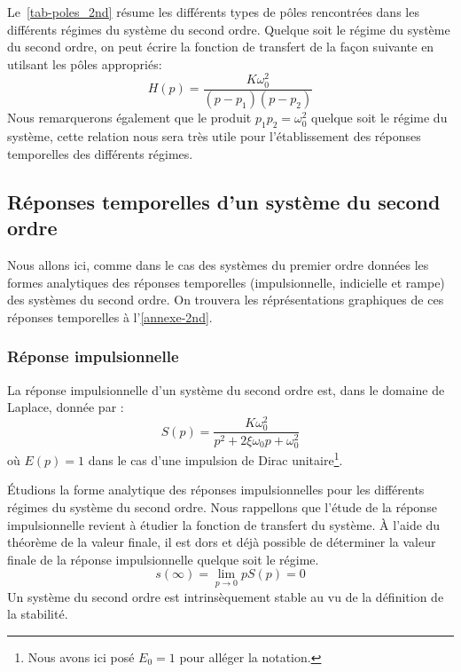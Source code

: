 Le~\cref{tab-poles_2nd} résume les différents types de pôles rencontrées dans 
les différents régimes du système du second ordre.
Quelque soit le régime du système du second ordre, on peut écrire la fonction 
de transfert de la façon suivante en utilsant les pôles appropriés:
\[
H(p)=\dfrac{K\omega^2_0}{(p-p_1)(p-p_2)}
\]
Nous remarquerons également que le produit $p_1p_2=\omega^2_0$ quelque soit 
le régime du système, cette relation nous sera très utile pour 
l'établissement des réponses temporelles des différents régimes.
\subsection{Réponses temporelles d'un système du second ordre}
Nous allons ici, comme dans le cas des systèmes du premier ordre données 
les formes analytiques des réponses temporelles (impulsionnelle, indicielle 
et rampe) des systèmes du second ordre. On trouvera les réprésentations 
graphiques de ces réponses temporelles à l'\cref{annexe-2nd}.
\subsubsection{Réponse impulsionnelle}
La réponse impulsionnelle d'un système du second ordre est, dans le domaine 
de Laplace, donnée par :
\[
S(p)=\dfrac{K\omega_0^2}{p^2+2\xi\omega_0p+\omega_0^2}
\]
où $E(p)=1$ dans le cas d'une impulsion de Dirac unitaire\footnote{Nous avons 
ici posé $E_0=1$ pour alléger la notation.}.

\'Etudions la forme analytique des réponses impulsionnelles pour les 
différents régimes du système du second ordre. Nous rappellons que l'étude 
de la réponse impulsionnelle revient à étudier la fonction de 
transfert du système. 
\`A l'aide du théorème de la valeur finale, 
il est dors et déjà possible de déterminer la valeur finale de la réponse
impulsionnelle quelque soit le régime.
\[
s(\infty)=\lim\limits_{p\to 0} pS(p) = 0
\]
Un système du second ordre est intrinsèquement stable au vu de 
la définition de la stabilité.
